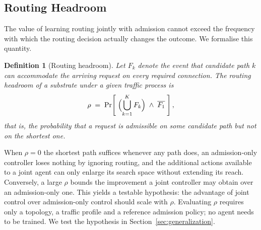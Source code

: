 \documentclass[10pt,journal,comsoc]{IEEEtran}
\newtheorem{definition}{Definition}
\begin{document}
\subsection{Routing Headroom}
The value of learning routing jointly with admission cannot exceed the
frequency with which the routing decision actually changes the outcome.
We formalise this quantity.

\begin{definition}[Routing headroom]
\label{def:rho}
Let $F_k$ denote the event that candidate path $k$ can accommodate the
arriving request on every required connection. The routing headroom of a
substrate under a given traffic process is
\begin{equation}
\rho \;=\; \Pr\!\left[\; \Bigl(\bigcup_{k=1}^{K} F_k\Bigr) \;\wedge\; \overline{F_1} \;\right],
\label{eq:rho}
\end{equation}
that is, the probability that a request is admissible on some candidate
path but not on the shortest one.
\end{definition}

When $\rho = 0$ the shortest path suffices whenever any path does, an
admission-only controller loses nothing by ignoring routing, and the
additional actions available to a joint agent can only enlarge its
search space without extending its reach. Conversely, a large $\rho$
bounds the improvement a joint controller may obtain over an
admission-only one. This yields a testable hypothesis: the advantage of
joint control over admission-only control should scale with $\rho$.
Evaluating $\rho$ requires only a topology, a traffic profile and a
reference admission policy; no agent needs to be trained. We test the
hypothesis in Section~\ref{sec:generalization}.
\end{document}

